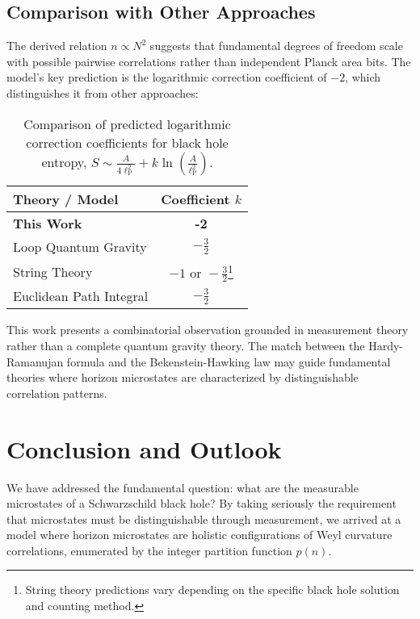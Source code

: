 \documentclass[12pt, letterpaper]{article}
\newcommand{\ellp}{\ell_{\mathrm{P}}}
\begin{document}
\subsection{Comparison with Other Approaches}

The derived relation $n \propto N^2$ suggests that fundamental degrees of freedom scale with possible pairwise correlations rather than independent Planck area bits. The model's key prediction is the logarithmic correction coefficient of $-2$, which distinguishes it from other approaches:

\begin{table}[h!]
\centering
\caption{Comparison of predicted logarithmic correction coefficients for black hole entropy, $S \sim \frac{A}{4\ellp^2} + k \ln \left( \frac{A}{\ellp^2} \right)$.}
\label{tab:comparison}
\begin{tabular}{lc}
\toprule
\textbf{Theory / Model} & \textbf{Coefficient $k$} \\
\midrule
\textbf{This Work} & \textbf{-2} \\
Loop Quantum Gravity \cite{Kaul2000} & $-\frac{3}{2}$ \\
String Theory \cite{Sen2012} & $-1 \text{ or } -\frac{3}{2}$\footnote{String theory predictions vary depending on the specific black hole solution and counting method.} \\
Euclidean Path Integral \cite{Gibbons1978} & $-\frac{3}{2}$ \\
\bottomrule
\end{tabular}
\end{table}

This work presents a combinatorial observation grounded in measurement theory rather than a complete quantum gravity theory. The match between the Hardy-Ramanujan formula and the Bekenstein-Hawking law may guide fundamental theories where horizon microstates are characterized by distinguishable correlation patterns.

\section{Conclusion and Outlook}

We have addressed the fundamental question: what are the measurable microstates of a Schwarzschild black hole? By taking seriously the requirement that microstates must be distinguishable through measurement, we arrived at a model where horizon microstates are holistic configurations of Weyl curvature correlations, enumerated by the integer partition function $p(n)$.
\end{document}
